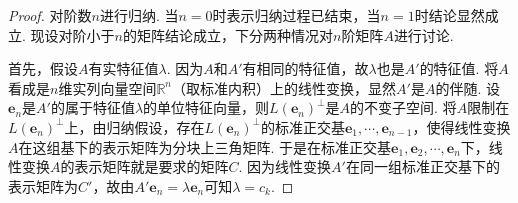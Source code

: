 \documentclass[../../main.tex]{subfiles}%
\begin{document}
\begin{proof}

对阶数\(n\)进行归纳. 当\(n = 0\)时表示归纳过程已结束，当\(n = 1\)时结论显然成立. 现设对阶小于\(n\)的矩阵结论成立，下分两种情况对\(n\)阶矩阵\(A\)进行讨论.

首先，假设\(A\)有实特征值\(\lambda\). 因为\(A\)和\(A'\)有相同的特征值，故\(\lambda\)也是\(A'\)的特征值. 将\(A\)看成是\(n\)维实列向量空间\(\mathbb{R}^n\)（取标准内积）上的线性变换，显然\(A'\)是\(A\)的伴随. 设\(\boldsymbol{e}_n\)是\(A'\)的属于特征值\(\lambda\)的单位特征向量，则\(L(\boldsymbol{e}_n)^\perp\)是\(A\)的不变子空间. 将\(A\)限制在\(L(\boldsymbol{e}_n)^\perp\)上，由归纳假设，存在\(L(\boldsymbol{e}_n)^\perp\)的标准正交基\(\boldsymbol{e}_1,\cdots,\boldsymbol{e}_{n - 1}\)，使得线性变换\(A\)在这组基下的表示矩阵为分块上三角矩阵. 于是在标准正交基\(\boldsymbol{e}_1,\boldsymbol{e}_2,\cdots,\boldsymbol{e}_n\)下，线性变换\(A\)的表示矩阵就是要求的矩阵\(C\). 因为线性变换\(A'\)在同一组标准正交基下的表示矩阵为\(C'\)，故由\(A'\boldsymbol{e}_n=\lambda\boldsymbol{e}_n\)可知\(\lambda = c_k\).


\end{proof}
\end{document}
